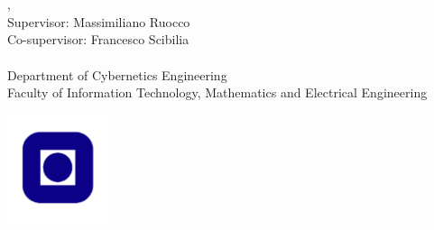 

\begin{titlepage}
\noindent {\large \textbf{\thesisAuthor}}
\vspace{2cm}\\
\noindent {\Huge \thesisTitle}
\vspace{2cm}\\
\noindent \thesisType, \thesisDate 
\vspace{1cm}
\noindent \\ Supervisor: Massimiliano Ruocco \\
\noindent Co-supervisor: Francesco Scibilia\\
\vspace{1cm}
\noindent \\Department of Cybernetics Engineering\\ Faculty of Information Technology, Mathematics and Electrical Engineering\\
\vfill
\begin{center}
\includegraphics[width=3cm]{Image/NTNUlogo.pdf}
\end{center}
\end{titlepage}

\thispagestyle{empty}

\cleardoublepage

\frontmatter



\tableofcontents

\listoffigures

\listoftables

\mainmatter

